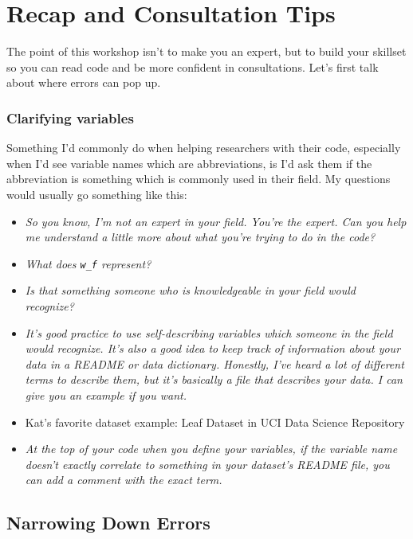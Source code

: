 \documentclass[
]{book}
\providecommand{\tightlist}{%
  \setlength{\itemsep}{0pt}\setlength{\parskip}{0pt}}
\begin{document}
\chapter{Recap and Consultation Tips}\label{recap-and-consultation-tips}

The point of this workshop isn't to make you an expert, but to build your skillset so you can read code and be more confident in consultations. Let's first talk about where errors can pop up.

\subsection{Clarifying variables}\label{clarifying-variables}

Something I'd commonly do when helping researchers with their code, especially when I'd see variable names which are abbreviations, is I'd ask them if the abbreviation is something which is commonly used in their field. My questions would usually go something like this:

\begin{itemize}
\tightlist
\item
  \emph{So you know, I'm not an expert in your field. You're the expert. Can you help me understand a little more about what you're trying to do in the code?}
\item
  \emph{What does \texttt{w\_f} represent?}
\item
  \emph{Is that something someone who is knowledgeable in your field would recognize?}
\item
  \emph{It's good practice to use self-describing variables which someone in the field would recognize. It's also a good idea to keep track of information about your data in a README or data dictionary. Honestly, I've heard a lot of different terms to describe them, but it's basically a file that describes your data. I can give you an example if you want.}
\item
  Kat's favorite dataset example: Leaf Dataset in UCI Data Science Repository \citep{leaf_288}
\item
  \emph{At the top of your code when you define your variables, if the variable name doesn't exactly correlate to something in your dataset's README file, you can add a comment with the exact term.}
\end{itemize}

\section{Narrowing Down Errors}\label{narrowing-down-errors}
\end{document}
